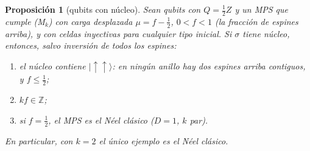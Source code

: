 \documentclass[11pt,a4paper]{article}
\newtheorem{proposicion}[teorema]{Proposición}
\theoremstyle{remark}
\newcommand{\ket}[1]{|#1\rangle}
\begin{document}
\begin{proposicion}[qubits con núcleo]\label{prop:qubits}
Sean qubits con $Q=\tfrac12Z$ y un MPS que cumple (M$_k$) con carga desplazada $\mu=f-\tfrac12$,
$0<f<1$ (la fracción de espines arriba), y con celdas inyectivas para cualquier tipo inicial.
Si $\sigma$ tiene núcleo, entonces, salvo inversión de todos los espines:
\begin{enumerate}
\item[(i)] el núcleo contiene $\ket{\uparrow\uparrow}$: en ningún anillo hay dos espines arriba
  contiguos, y $f\le\tfrac12$;
\item[(ii)] $kf\in\mathbb Z$;
\item[(iii)] si $f=\tfrac12$, el MPS es el Néel clásico ($D=1$, $k$ par).
\end{enumerate}
En particular, con $k=2$ el único ejemplo es el Néel clásico.
\end{proposicion}
\end{document}
